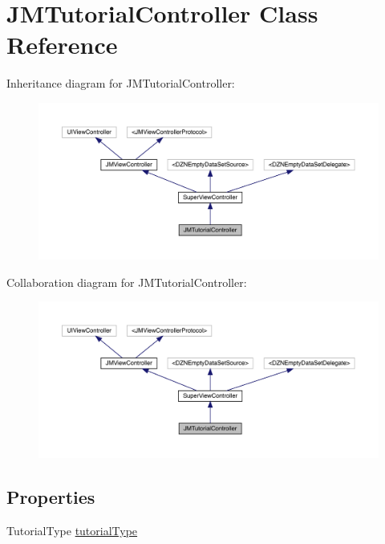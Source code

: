 \hypertarget{interface_j_m_tutorial_controller}{}\section{J\+M\+Tutorial\+Controller Class Reference}
\label{interface_j_m_tutorial_controller}


Inheritance diagram for J\+M\+Tutorial\+Controller\+:\nopagebreak
\begin{figure}[H]
\begin{center}
\leavevmode
\includegraphics[width=350pt]{interface_j_m_tutorial_controller__inherit__graph}
\end{center}
\end{figure}


Collaboration diagram for J\+M\+Tutorial\+Controller\+:\nopagebreak
\begin{figure}[H]
\begin{center}
\leavevmode
\includegraphics[width=350pt]{interface_j_m_tutorial_controller__coll__graph}
\end{center}
\end{figure}
\subsection*{Properties}
\begin{DoxyCompactItemize}
\item 
Tutorial\+Type \mbox{\hyperlink{interface_j_m_tutorial_controller_aaf55822e77a3675e64f71078d6000acf}{tutorial\+Type}}
\end{DoxyCompactItemize}
